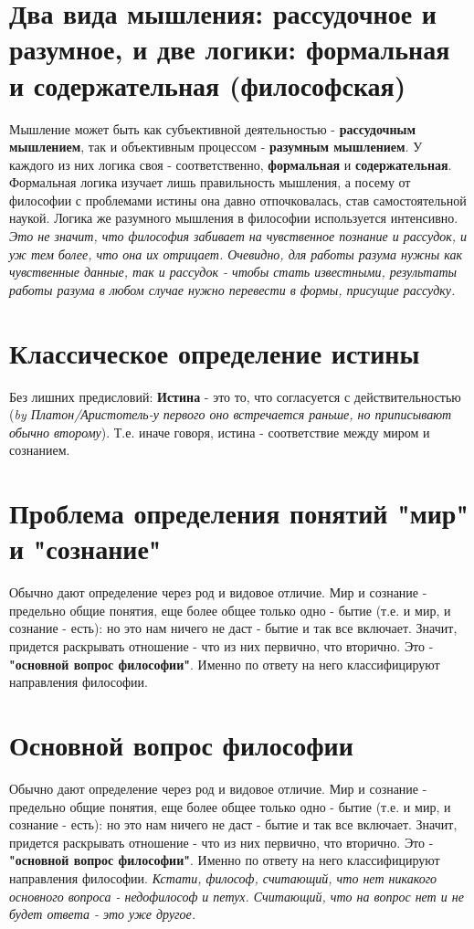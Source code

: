 \documentclass[12pt,a4paper]{article}
\begin{document}
\section{Два вида мышления: рассудочное и разумное, и две логики: формальная и содержательная (философская)}
Мышление может быть как субъективной деятельностью - \textbf{рассудочным мышлением},
так и объективным процессом - \textbf{разумным мышлением}. 
У каждого из них логика своя - соответственно, \textbf{формальная} и \textbf{содержательная}.
Формальная логика изучает лишь правильность мышления, а посему от философии с проблемами истины она давно отпочковалась, став самостоятельной наукой. Логика же разумного мышления в философии используется интенсивно. 
\textit{ Это не значит, что философия забивает на чувственное познание и рассудок, и уж тем более, что она их отрицает. Очевидно, для работы разума нужны как чувственные данные, так и рассудок - чтобы стать известными, результаты работы разума в любом случае нужно перевести в формы, присущие рассудку.}

\section{Классическое определение истины}
Без лишних предисловий: \textbf{Истина} - это то, что согласуется с действительностью (\textit{by Платон/Аристотель-у первого оно встречается раньше, но приписывают обычно второму}). 
Т.е. иначе говоря, истина - соответствие между миром и сознанием.

\section{Проблема определения понятий "мир" и "сознание"}
Обычно дают определение через род и видовое отличие. Мир и сознание - предельно общие понятия, еще более общее только одно - бытие (т.е. и мир, и сознание - есть): но это нам ничего не даст - бытие и так все включает. Значит, придется раскрывать отношение - что из них первично, что вторично. Это - \textbf{"основной вопрос философии"}. Именно по ответу на него классифицируют направления философии.

\section{Основной вопрос философии}
Обычно дают определение через род и видовое отличие. Мир и сознание - предельно общие понятия, еще более общее только одно - бытие (т.е. и мир, и сознание - есть): но это нам ничего не даст - бытие и так все включает. Значит, придется раскрывать отношение - что из них первично, что вторично. Это - \textbf{"основной вопрос философии"}. Именно по ответу на него классифицируют направления философии. \textit{Кстати, философ, считающий, что нет никакого основного вопроса - недофилософ и петух. Считающий, что на вопрос нет и не будет ответа - это уже другое.}
\end{document}
